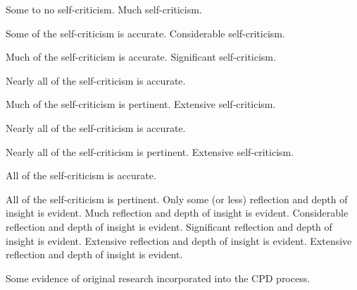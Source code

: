 \documentclass{../../fal_assignment}
\begin{document}
\rubricyearthree

\begin{markingrubric}
%
%
        \grade \fail		Some to no self-criticism.
        \grade 		Much self-criticism.
         \par 		Some of the self-criticism is accurate.
        \grade 		Considerable self-criticism.
         \par 		Much of the self-criticism is accurate.
        \grade 		Significant self-criticism.
         \par 		Nearly all of the self-criticism is accurate.
            \par 		Much of the self-criticism is pertinent.
        \grade 		Extensive self-criticism.
         \par 		Nearly all of the self-criticism is accurate.
            \par 		Nearly all of the self-criticism is pertinent.
        \grade 		Extensive self-criticism.
         \par 		All of the self-criticism is accurate.
            \par 		All of the self-criticism is pertinent.
%
        \grade \fail 	Only some (or less) reflection and depth of insight is evident.
        \grade 		Much reflection and depth of insight is evident.
        \grade 		Considerable reflection and depth of insight is evident.
        \grade 		Significant reflection and depth of insight is evident.
        \grade 		Extensive reflection and depth of insight is evident.
        \grade 		Extensive reflection and depth of insight is evident.
        \par 		Some evidence of original research incorporated into the CPD process.

\end{markingrubric}
\end{document}
